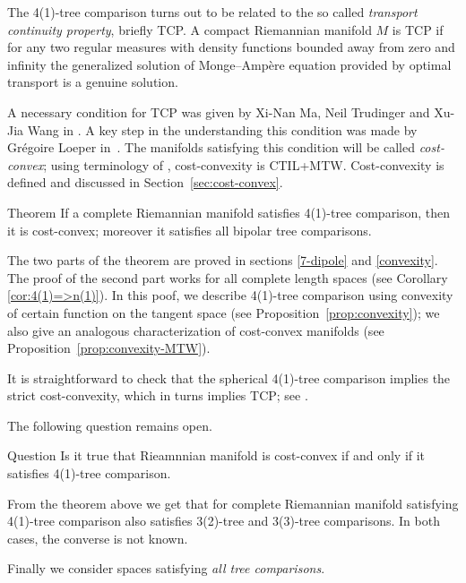 The 4(1)-tree comparison turns out to be related to the  so called \emph{transport continuity property}, briefly TCP.
A compact Riemannian manifold $M$ is TCP 
if for any two regular measures with density functions bounded away from zero and infinity the generalized solution of Monge--Amp\`{e}re equation provided by optimal transport 
is a genuine solution.



A necessary condition for TCP was given by Xi-Nan Ma, Neil Trudinger and Xu-Jia Wang in \cite{MTW}.
A key step in the understanding this condition was made by Grégoire Loeper in~\cite{loeper}.
The manifolds satisfying this condition will be called \emph{cost-convex};
using terminology of \cite{MTW+CTIL}, cost-convexity is CTIL+MTW.
Cost-convexity is defined and discussed in Section~\ref{sec:cost-convex}.

\begin{thm}{Theorem}\label{T=>CTIL:CTIL}
If a complete Riemannian manifold satisfies 4(1)-tree comparison, then it is cost-convex; moreover it satisfies all bipolar tree comparisons.
\end{thm}

The two parts of the theorem are proved in sections \ref{7-dipole} and \ref{convexity}.
The proof of the second part works for all complete length spaces (see Corollary \ref{cor:4(1)=>n(1)}).
In this poof, we describe 4(1)-tree comparison using convexity of certain function on the tangent space (see Proposition~\ref{prop:convexity});
we also give an analogous characterization of cost-convex manifolds (see Proposition~\ref{prop:convexity-MTW}).

It is straightforward to check that the spherical 4(1)-tree comparison implies the strict cost-convexity, which in turns implies TCP; see \cite{FRV-Nec+Suf}.

The following question remains open.

\begin{thm}{Question}
Is it true that Rieamnnian manifold is cost-convex if and only if it satisfies 4(1)-tree comparison. 
\end{thm}

From the theorem  above we get that for complete Riemannian manifold satisfying 4(1)-tree comparison also satisfies 3(2)-tree and 3(3)-tree comparisons.
In both cases, the converse is not known.

Finally we consider spaces satisfying \emph{all tree comparisons}.

